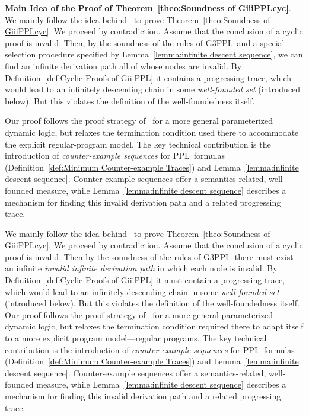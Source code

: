 \documentclass[manuscript,screen]{acmart}
\newcommand{\GiiiPPL}[0]{\mbox{G3PPL}}
\newcommand{\PPL}[0]{\mbox{PPL}}
\begin{document}
\textbf{Main Idea of the Proof of Theorem~\ref{theo:Soundness of GiiiPPLcyc}}. 
We mainly follow the idea behind~\cite{Brotherston08,zhang2025parameterizeddynamiclogic} to prove Theorem~\ref{theo:Soundness of GiiiPPLcyc}.
We proceed by contradiction. 
Assume that the conclusion of a cyclic proof is invalid. 
Then, by the soundness of the rules of \GiiiPPL\ and a special selection procedure specified by Lemma~\ref{lemma:infinite descent sequence}, we can find an infinite derivation path all of whose nodes are invalid. 
By Definition~\ref{def:Cyclic Proofs of GiiiPPL} it contains a progressing trace, which would lead to an infinitely descending chain in some \emph{well-founded set} (introduced below). 
But this violates the definition of the well-foundedness itself. 

Our proof follows the proof strategy of~\cite{zhang2025parameterizeddynamiclogic} for a more general parameterized dynamic logic, but relaxes the termination condition used there to accommodate the explicit regular-program model. 
The key technical contribution is the introduction of \emph{counter-example sequences} for \PPL\ formulas (Definition~\ref{def:Minimum Counter-example Traces}) and Lemma~\ref{lemma:infinite descent sequence}. Counter-example sequences offer a semantics-related, well-founded measure, while Lemma~\ref{lemma:infinite descent sequence} describes a mechanism for finding this invalid derivation path and a related progressing trace.  

\ifx
We mainly follow the idea behind~\cite{Brotherston08,zhang2025parameterizeddynamiclogic,} to prove Theorem~\ref{theo:Soundness of GiiiPPLcyc}.
We proceed by contradiction. 
Assume that the conclusion of a cyclic proof is invalid. 
Then by the soundness of the rules of \GiiiPPL\ there must exist an infinite \emph{invalid infinite derivation path} in which each node is invalid. 
By Definition~\ref{def:Cyclic Proofs of GiiiPPL} it must contain a progressing trace, which would lead to an infinitely descending chain in some \emph{well-founded set} (introduced below). 
But this violates the definition of the well-foundedness itself. 
Our proof follows the proof strategy of~\cite{zhang2025parameterizeddynamiclogic} for a more general parameterized dynamic logic, but relaxes the termination condition required there to adapt itself to a more explicit program model---regular programs. 
The key technical contribution is the introduction of \emph{counter-example sequences} for \PPL\ formulas (Definition~\ref{def:Minimum Counter-example Traces}) and Lemma~\ref{lemma:infinite descent sequence}. Counter-example sequences offer a semantics-related, well-founded measure, while Lemma~\ref{lemma:infinite descent sequence} describes a mechanism for finding this invalid derivation path and a related progressing trace.  %
\end{document}
